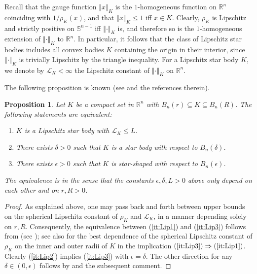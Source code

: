 \documentclass[11pt]{article}
\newtheorem{prop}[thm]{Proposition}
\theoremstyle{definition}
\theoremstyle{proof}
\DeclareMathOperator{\+}{\mathop{\tilde{+}}}
\newcommand{\Lip}{\mathcal{L}}
\newcommand{\norm}[1]{\left\Vert#1\right\Vert}
\newcommand{\R}{\mathbb{R}}
\renewcommand{\S}{\mathbb{S}}
\newcommand{\eps}{\epsilon}
\numberwithin{equation}{section}
\numberwithin{equation}{section}
\begin{document}
Recall that the gauge function $\norm{x}_K$ is the $1$-homogeneous function on $\R^n$ coinciding with $1 / \rho_K(x)$, and that $\norm{x}_K \leq 1$ iff $x \in K$.  
Clearly, $\rho_K$ is Lipschitz and strictly positive on $\S^{n-1}$ iff $\norm{\cdot}_K$ is, and therefore so is the $1$-homogeneous extension of $\norm{\cdot}_K$ to $\R^n$.
In particular, it follows that the class of Lipschitz star bodies includes all convex bodies $K$ containing the origin in their interior, since $\norm{\cdot}_K$ is trivially Lipschitz by the triangle inequality. For a Lipschitz star body $K$, we denote by $\Lip_K < \infty$ the Lipschitz constant of $\norm{\cdot}_K$ on $\R^n$. 

 

\smallskip
The following proposition is known (see \cite{LinWu-LipschitzStarBodiesReview} and the references therein).
\begin{prop} \label{prop:Lip}
Let $K$ be a compact set in $\R^n$ with $B_n(r) \subseteq K \subseteq B_n(R)$. The following statements are equivalent:
\begin{enumerate}
\item \label{it:Lip1} $K$ is a Lipschitz star body with $\Lip_K \leq L$.
\item \label{it:Lip2} There exists $\delta > 0$ such that $K$ is a star body with respect to $B_n(\delta)$. 
\item \label{it:Lip3} There exists $\eps > 0$ such that $K$ is star-shaped with respect to $B_n(\eps)$. 
\end{enumerate}
The equivalence is in the sense that the constants $\eps,\delta,L>0$ above only depend on each other and on $r, R > 0$. 
\end{prop}
\begin{proof}
As explained above, one may pass back and forth between upper bounds on the spherical Lipschitz constant of $\rho_K$ and $\Lip_K$, in a manner depending solely on $r , R$. Consequently, the equivalence between (\ref{it:Lip1}) and (\ref{it:Lip3}) follows from \cite[Theorem 2.1]{LinWu-LipschitzStarBodiesReview} (see \cite[Lemmas 3.2, 3.3 and 3.4]{LinWu-LipschitzStarBodiesReview}); see also \cite[Theorem 2]{Toranzos-LipschitzConstant} for the best dependence of the spherical Lipschitz constant of $\rho_K$ on the inner and outer radii of $K$ in the implication $(\ref{it:Lip3}) \Rightarrow (\ref{it:Lip1})$. 
Clearly (\ref{it:Lip2}) implies (\ref{it:Lip3}) with $\eps = \delta$. The other direction for any $\delta \in (0,\eps)$ follows by \cite[Lemma 3.1]{LinWu-LipschitzStarBodiesReview} and the subsequent comment. 
\end{proof}
\end{document}
